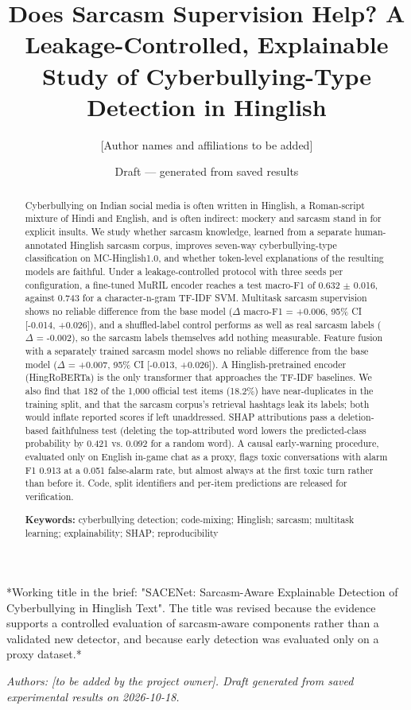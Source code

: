 \documentclass[10pt,twocolumn]{article}
\title{Does Sarcasm Supervision Help? A Leakage-Controlled, Explainable Study of Cyberbullying-Type Detection in Hinglish}
\author{[Author names and affiliations to be added]}
\date{Draft --- generated from saved results}
\begin{document}
\maketitle

*Working title in the brief: "SACENet: Sarcasm-Aware Explainable Detection of Cyberbullying in Hinglish Text". The
title was revised because the evidence supports a controlled evaluation of sarcasm-aware components rather than a
validated new detector, and because early detection was evaluated only on a proxy dataset.*

\emph{Authors: [to be added by the project owner]. Draft generated from saved experimental results on 2026-10-18.}

\begin{abstract}

Cyberbullying on Indian social media is often written in Hinglish, a Roman-script mixture of Hindi and English, and
is often indirect: mockery and sarcasm stand in for explicit insults. We study whether sarcasm knowledge, learned from a
separate human-annotated Hinglish sarcasm corpus, improves seven-way cyberbullying-type classification on
MC-Hinglish1.0, and whether token-level explanations of the resulting models are faithful. Under a leakage-controlled
protocol with three seeds per configuration, a fine-tuned MuRIL encoder reaches a test macro-F1 of
0.632 $\pm$ 0.016, against
0.743 for a character-n-gram TF-IDF SVM. Multitask sarcasm supervision shows no reliable difference from the base model ($\Delta$ macro-F1 = +0.006, 95\% CI [-0.014, +0.026]), and a shuffled-label control performs as well as real sarcasm labels ($\Delta$ = -0.002), so the sarcasm labels themselves add nothing measurable. Feature fusion with a separately trained sarcasm model shows no reliable difference from the base model ($\Delta$ = +0.007, 95\% CI [-0.013, +0.026]). A Hinglish-pretrained encoder (HingRoBERTa) is the only transformer that approaches the TF-IDF baselines. We also find
that 182 of the 1,000 official test items (18.2\%) have near-duplicates in the training split, and
that the sarcasm corpus's retrieval hashtags leak its labels; both would inflate reported scores if left unaddressed.
SHAP attributions pass a deletion-based faithfulness test (deleting the top-attributed word lowers the predicted-class probability by 0.421 vs. 0.092 for a random word). A causal early-warning
procedure, evaluated only on English in-game chat as a proxy, flags toxic conversations with alarm F1 0.913 at a 0.051 false-alarm rate, but almost always at the first toxic turn rather than before it. Code, split identifiers and
per-item predictions are released for verification.

\textbf{Keywords:} cyberbullying detection; code-mixing; Hinglish; sarcasm; multitask learning; explainability; SHAP; reproducibility

\end{abstract}
\end{document}
